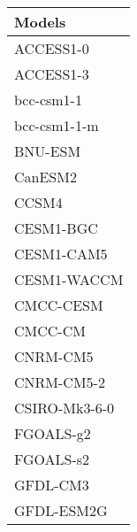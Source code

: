 \documentclass{ametsocV5}
\begin{document}
\begin{table}[t]
\begin{center}
  \renewcommand{\arraystretch}{1.0}
  \begin{tabular}{ l }
    Models          \\%
    \hline
    ACCESS1-0       \\%
    ACCESS1-3       \\%
    bcc-csm1-1      \\%
    bcc-csm1-1-m    \\%
    BNU-ESM         \\%
    CanESM2         \\%
    CCSM4           \\%
    CESM1-BGC       \\%
    CESM1-CAM5      \\%
    CESM1-WACCM     \\%
    CMCC-CESM       \\%
    CMCC-CM         \\%
    CNRM-CM5        \\%
    CNRM-CM5-2      \\%
    CSIRO-Mk3-6-0   \\%
    FGOALS-g2       \\%
    FGOALS-s2       \\%
    GFDL-CM3        \\%
    GFDL-ESM2G      \\%

\end{tabular}
\end{center}
\end{table}
\end{document}
